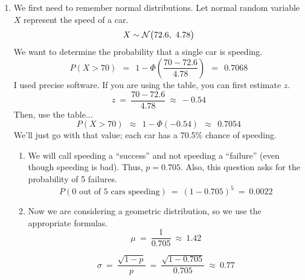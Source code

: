 \documentclass[12pt,letterpaper]{article}
\begin{document}
\begin{enumerate}
\item We first need to remember normal distributions. Let normal random variable $X$ represent the speed of a car.
$$X\sim \mathcal{N}\big(72.6,~4.78\big) $$
We want to determine the probability that a single car is speeding.
$$P(X > 70) ~~=~~ 1- \Phi\left(\frac{70-72.6}{4.78}\right) ~~=~~ 0.7068 $$
I used precise software. If you are using the table, you can first estimate $z$.
$$z ~=~ \frac{70-72.6}{4.78} ~\approx~ -0.54 $$
Then, use the table...
$$P(X > 70) ~~\approx~~ 1-\Phi(-0.54) ~~\approx~~ 0.7054  $$
We'll just go with that value; each car has a 70.5\% chance of speeding.
\begin{enumerate}
\item We will call speeding a ``success'' and not speeding a ``failure'' (even though speeding is bad). Thus, $p=0.705$. Also, this question asks for the probability of 5 failures.
$$P(\text{0 out of 5 cars speeding}) ~=~ (1-0.705)^5 ~=~ 0.0022  $$
\item Now we are considering a geometric distribution, so we use the appropriate formulas.
$$\mu ~=~ \frac{1}{0.705} ~\approx~ 1.42$$

$$\sigma ~=~ \frac{\sqrt{1-p}}{p} ~=~ \frac{\sqrt{1-0.705}}{0.705}~\approx~ 0.77$$
\end{enumerate}




\end{enumerate}
\end{document}

